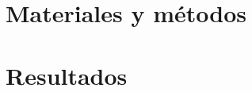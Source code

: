 \documentclass[11pt]{book}
\renewcommand{\baselinestretch}{1.2}
\begin{document}
\renewcommand{\tablename}{Tabla}




%
\mastersthesis
%
%
%
\tableofcontents

%

%

%

\chapter{Materiales y métodos}
\label{ch:ch2}


\chapter{Resultados}
\label{ch:ch3}


%
\end{document}
